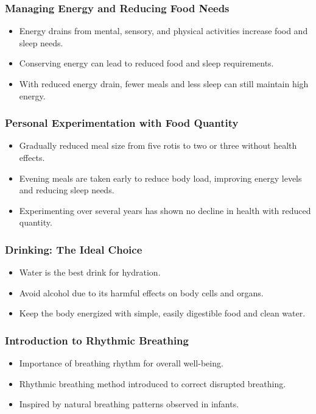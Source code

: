 \begin{frame}[fragile]\frametitle{Managing Energy and Reducing Food Needs}
    \begin{itemize}
        \item Energy drains from mental, sensory, and physical activities increase food and sleep needs.
        \item Conserving energy can lead to reduced food and sleep requirements.
        \item With reduced energy drain, fewer meals and less sleep can still maintain high energy.
    \end{itemize}
\end{frame}

\begin{frame}[fragile]\frametitle{Personal Experimentation with Food Quantity}
    \begin{itemize}
        \item Gradually reduced meal size from five rotis to two or three without health effects.
        \item Evening meals are taken early to reduce body load, improving energy levels and reducing sleep needs.
        \item Experimenting over several years has shown no decline in health with reduced quantity.
    \end{itemize}
\end{frame}

\begin{frame}[fragile]\frametitle{Drinking: The Ideal Choice}
    \begin{itemize}
        \item Water is the best drink for hydration.
        \item Avoid alcohol due to its harmful effects on body cells and organs.
        \item Keep the body energized with simple, easily digestible food and clean water.
    \end{itemize}
\end{frame}

\begin{frame}[fragile]\frametitle{Introduction to Rhythmic Breathing}
    \begin{itemize}
        \item Importance of breathing rhythm for overall well-being.
        \item Rhythmic breathing method introduced to correct disrupted breathing.
        \item Inspired by natural breathing patterns observed in infants.
    \end{itemize}
\end{frame}

